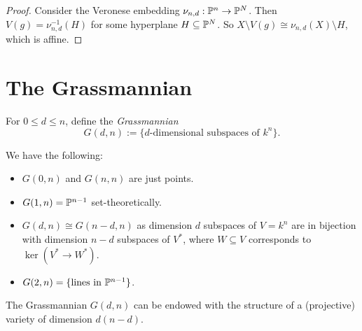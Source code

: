 \begin{proof}
  Consider the Veronese
  embedding $\nu_{n, d} : \mathbb{P}^n \to \mathbb{P}^N$.
  Then $V(g) = \nu_{n, d}^{-1}(H)$ for some
  hyperplane $H \subseteq \mathbb{P}^N$. So
  $X \setminus V(g) \cong \nu_{n, d}(X) \setminus H$,
  which is affine.
\end{proof}

\section{The Grassmannian}

\begin{definition}
  For $0 \le d \le n$, define the
  \emph{Grassmannian}
  \[
    G(d, n) :=
    \{
      \text{$d$-dimensional subspaces of }
      k^n
    \}.
  \]
\end{definition}

\begin{example}
  We have the following:
  \begin{itemize}
    \item $G(0, n)$ and $G(n, n)$ are
      just points.
    \item $G(1, n) = \mathbb{P}^{n - 1}$
      set-theoretically.
    \item $G(d, n) \cong G(n - d, n)$
      as dimension $d$ subspaces of
      $V = k^n$ are in bijection with
      dimension $n - d$ subspaces of
      $V^*$, where $W \subseteq V$
      corresponds to
      $\ker(V^* \to W^*)$.
    \item $G(2, n) = \{\text{lines in } \mathbb{P}^{n - 1}\}$.
  \end{itemize}
\end{example}

\begin{theorem}
  The Grassmannian
  $G(d, n)$ can be endowed with the
  structure of a (projective) variety of
  dimension $d(n - d)$.
\end{theorem}


